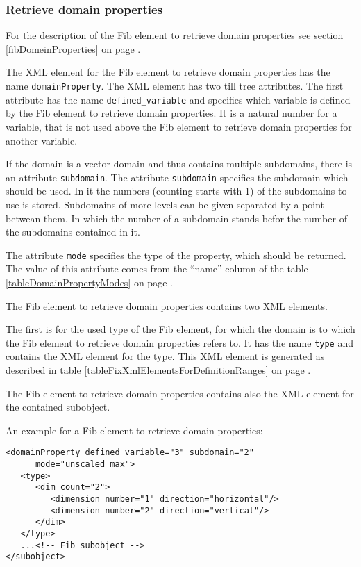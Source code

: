 

\subsubsection{Retrieve domain properties}

For the description of the Fib element to retrieve domain properties see section \ref{fibDomeinProperties} on page \pageref{fibDomeinProperties} .

The XML element for the Fib element to retrieve domain properties has the name \verb|domainProperty|. The XML element has two till tree attributes. The first attribute has the name \verb|defined_variable| and specifies which variable is defined by the Fib element to retrieve domain properties. It is a natural number for a variable, that is not used above the Fib element to retrieve domain properties for another variable.

If the domain is a vector domain and thus contains multiple subdomains, there is an attribute \verb|subdomain|. The attribute \verb|subdomain| specifies the subdomain which should be used. In it the numbers (counting starts with 1) of the subdomains to use is stored.  Subdomains of more levels can be given separated by a point betwean them. In which the number of a subdomain stands befor the number of the subdomains contained in it.

The attribute \verb|mode| specifies the type of the property, which should be returned. The value of this attribute comes from the ``name'' column of the table \ref{tableDomainPropertyModes} on page \pageref{tableDomainPropertyModes} .

The Fib element to retrieve domain properties contains two XML elements.

The first is for the used type of the Fib element, for which the domain is to which the Fib element to retrieve domain properties refers to. It has the name \verb|type| and contains the XML element for the type. This XML element is generated as described in table \ref{tableFixXmlElementsForDefinitionRanges} on page \pageref{tableFixXmlElementsForDefinitionRanges} . 

The Fib element to retrieve domain properties contains also the XML element for the contained subobject.

\bigskip\noindent
An example for a Fib element to retrieve domain properties:
\begin{verbatim}
<domainProperty defined_variable="3" subdomain="2"
      mode="unscaled max">
   <type>
      <dim count="2">
         <dimension number="1" direction="horizontal"/>
         <dimension number="2" direction="vertical"/>
      </dim>
   </type>
   ...<!-- Fib subobject -->
</subobject>
\end{verbatim}

